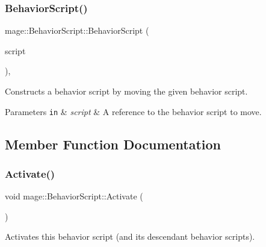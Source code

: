 \subsubsection{\texorpdfstring{Behavior\+Script()}{BehaviorScript()}\hspace{0.1cm}{\footnotesize\ttfamily [3/3]}}
{\footnotesize\ttfamily mage\+::\+Behavior\+Script\+::\+Behavior\+Script (\begin{DoxyParamCaption}\item[{\hyperlink{classmage_1_1_behavior_script}{Behavior\+Script} \&\&}]{script }\end{DoxyParamCaption})\hspace{0.3cm}{\ttfamily [protected]}, {\ttfamily [default]}}

Constructs a behavior script by moving the given behavior script.


\begin{DoxyParams}[1]{Parameters}
\mbox{\tt in}  & {\em script} & A reference to the behavior script to move. \\
\hline
\end{DoxyParams}


\subsection{Member Function Documentation}
\hypertarget{classmage_1_1_behavior_script_a84a5bf0fc7ec3ecd36dddaf001143b54}{}\label{classmage_1_1_behavior_script_a84a5bf0fc7ec3ecd36dddaf001143b54} 
\subsubsection{\texorpdfstring{Activate()}{Activate()}}
{\footnotesize\ttfamily void mage\+::\+Behavior\+Script\+::\+Activate (\begin{DoxyParamCaption}{ }\end{DoxyParamCaption})\hspace{0.3cm}{\ttfamily [noexcept]}}

Activates this behavior script (and its descendant behavior scripts). \hypertarget{classmage_1_1_behavior_script_ab45260db9c30d596b1d688a01458f63e}{}\label{classmage_1_1_behavior_script_ab45260db9c30d596b1d688a01458f63e} 
